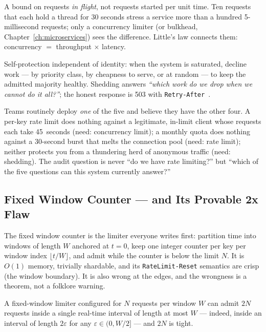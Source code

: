 \begin{definition}
A bound on requests \emph{in flight}, not requests started per unit time.
Ten requests that each hold a thread for 30 seconds stress a service more
than a hundred 5-millisecond requests; only a concurrency limiter (or bulkhead,
Chapter~\ref{ch:microservices}) sees the difference. Little's law connects
them: concurrency $=$ throughput $\times$ latency.
\end{definition}

\begin{definition}
Self-protection independent of identity: when the system is saturated,
decline work --- by priority class, by cheapness to serve, or at random ---
to keep the admitted majority healthy. Shedding answers \emph{``which work
do we drop when we cannot do it all?''}; the honest response is 503 with
\texttt{Retry-After}~\cite{rfc9110}.
\end{definition}

\begin{warningbox}
Teams routinely deploy \emph{one} of the five and believe they have the
other four. A per-key rate limit does nothing against a legitimate,
in-limit client whose requests each take 45~seconds (need: concurrency
limit); a monthly quota does nothing against a 30-second burst that melts
the connection pool (need: rate limit); neither protects you from a
thundering herd of anonymous traffic (need: shedding). The audit question
is never ``do we have rate limiting?'' but ``which of the five questions
can this system currently answer?''
\end{warningbox}

\subsection{Fixed Window Counter --- and Its Provable 2x Flaw}
\label{subsec:ch14-fixed-window}

The fixed window counter is the limiter everyone writes first: partition
time into windows of length $W$ anchored at $t = 0$, keep one integer
counter per key per window index $\lfloor t/W \rfloor$, and admit while the
counter is below the limit $N$. It is $O(1)$ memory, trivially shardable,
and its \texttt{RateLimit-Reset} semantics are crisp (the window boundary).
It is also wrong at the edges, and the wrongness is a theorem, not a
folklore warning.

\begin{theorem}
\label{thm:ch14-fixed-window-2x}
A fixed-window limiter configured for $N$ requests per window $W$ can admit
$2N$ requests inside a single real-time interval of length at most $W$ ---
indeed, inside an interval of length $2\varepsilon$ for any
$\varepsilon \in (0, W/2]$ --- and $2N$ is tight.
\end{theorem}

